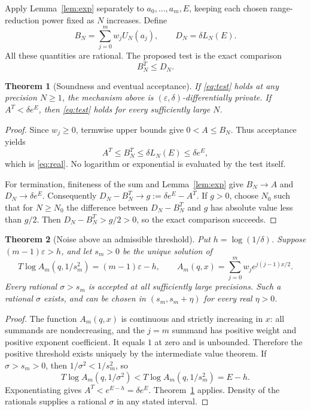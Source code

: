 \documentclass[11pt]{article}
\newtheorem{theorem}{Theorem}
\begin{document}
Apply Lemma~\ref{lem:exp} separately to $a_0,\ldots,a_m,E$, keeping each
chosen range-reduction power fixed as $N$ increases. Define
\[
 B_N=\sum_{j=0}^m w_j U_N(a_j),\qquad D_N=\delta L_N(E).
\]
All these quantities are rational. The proposed test is the exact comparison
\begin{equation}\label{eq:test}
 B_N^T\le D_N.
\end{equation}

\begin{theorem}[Soundness and eventual acceptance]\label{thm:check}
If \eqref{eq:test} holds at any precision $N\ge1$, the mechanism above is
$(\varepsilon,\delta)$-differentially private. If
$A^T<\delta e^E$, then \eqref{eq:test} holds for every sufficiently large $N$.
\end{theorem}
\begin{proof}
Since $w_j\ge0$, termwise upper bounds give $0<A\le B_N$.
Thus acceptance yields
\[
 A^T\le B_N^T\le\delta L_N(E)\le\delta e^E,
\]
which is \eqref{eq:real}. No logarithm or exponential is evaluated by the
test itself.

For termination, finiteness of the sum and Lemma~\ref{lem:exp} give
$B_N\to A$ and $D_N\to\delta e^E$. Consequently
$D_N-B_N^T\to g:=\delta e^E-A^T$.
If $g>0$, choose $N_0$ such that for $N\ge N_0$ the difference between
$D_N-B_N^T$ and $g$ has absolute value less than $g/2$.
Then $D_N-B_N^T>g/2>0$, so the exact comparison succeeds.
\end{proof}

\begin{theorem}[Noise above an admissible threshold]\label{thm:noise}
Put $h=\log(1/\delta)$. Suppose $(m-1)\varepsilon>h$, and let $s_m>0$
be the unique solution of
\[
 T\log A_m(q,1/s_m^2)=(m-1)\varepsilon-h,
 \qquad A_m(q,x)=\sum_{j=0}^m w_j e^{j(j-1)x/2}.
\]
Every rational $\sigma>s_m$ is accepted at all sufficiently large
precisions. Such a rational $\sigma$ exists, and can be chosen in
$(s_m,s_m+\eta)$ for every real $\eta>0$.
\end{theorem}
\begin{proof}
The function $A_m(q,x)$ is continuous and strictly increasing in $x$:
all summands are nondecreasing, and the $j=m$ summand has positive weight
and positive exponent coefficient. It equals $1$ at zero and is unbounded.
Therefore the positive threshold exists uniquely by the intermediate
value theorem. If $\sigma>s_m>0$, then $1/\sigma^2<1/s_m^2$, so
\[
 T\log A_m(q,1/\sigma^2)
 <T\log A_m(q,1/s_m^2)=E-h.
\]
Exponentiating gives $A^T<e^{E-h}=\delta e^E$.
Theorem~\ref{thm:check} applies. Density of the rationals supplies a
rational $\sigma$ in any stated interval.
\end{proof}
\end{document}
